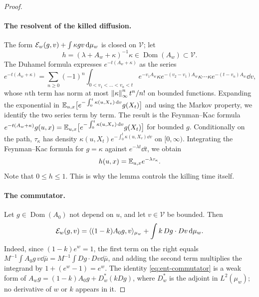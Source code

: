 \begin{proof}
\paragraph{The resolvent of the killed diffusion.}
The form $\mathcal E_w(g,v)+\int\kappa gv\,\mathrm d\mu_w$ is closed on $\mathcal V$; let
\[
 h=(\lambda+A_w+\kappa)^{-1}\kappa\in\operatorname{Dom}(A_w)\subset
 \mathcal V .
\]
The Duhamel formula expresses $e^{-t(A_w+\kappa)}$
as the series
\[
 e^{-t(A_w+\kappa)}=\sum_{n\ge0}(-1)^n\int_{0<v_1<\dots<v_n<t}
 e^{-v_1A_w}\kappa e^{-(v_2-v_1)A_w}\kappa\cdots\kappa
 e^{-(t-v_n)A_w}\dd v,
\]
whose $n$th term has norm at most $\left\lVert\kappa\right\rVert_\infty^nt^n/n!$ on bounded
functions.
Expanding the exponential in
$\mathbb E_{u,x}\bigl[e^{-\int_0^t\kappa(u,X_v)\,\mathrm d v}g(X_t)\bigr]$ and using the
Markov property, we identify the two series term by term. The result is
the Feynman--Kac formula
$e^{-t(A_w+\kappa)}g(u,x)=\mathbb E_{u,x}\bigl[e^{-\int_0^t\kappa(u,X_v)\,\mathrm d v}
g(X_t)\bigr]$ for bounded $g$. Conditionally on the path, $\tau_\kappa$ has
density $\kappa(u,X_t)e^{-\int_0^t\kappa(u,X_v)\dd v}$ on $[0,\infty)$.
Integrating the Feynman--Kac formula for $g=\kappa$ against
$e^{-\lambda t}\dd t$, we obtain
\begin{equation}\label{eq:ent-hazard-transform}
 h(u,x)=\mathbb E_{u,x}e^{-\lambda\tau_\kappa}.
\end{equation}
Note that $0\le h\le1$. This is why the lemma controls the killing
time itself.

\paragraph{The commutator.}
Let $g\in\operatorname{Dom}(A_0)$ not depend on $u$, and let $v\in\mathcal
V$ be bounded. Then
\begin{equation}\label{eq:ent-commutator}
 \mathcal E_w(g,v)=\langle(1-k)A_0g,v\rangle_{\mu_w}+\int k\,Dg\cdot Dv\,\mathrm d\mu_w .
\end{equation}
Indeed, since $(1-k)e^w=1$, the first term on the right equals
$M^{-1}\int A_0g\,v\dd\bar\mu=M^{-1}\int Dg\cdot Dv\dd\bar\mu$, and adding the
second term multiplies the integrand by $1+(e^w-1)=e^w$. The identity
\eqref{eq:ent-commutator} is a weak form of $A_wg=(1-k)A_0g+D^*_w(kDg)$,
where $D^*_w$ is the adjoint in $L^2(\mu_w)$; no derivative of $w$ or $k$
appears in it.


\end{proof}
